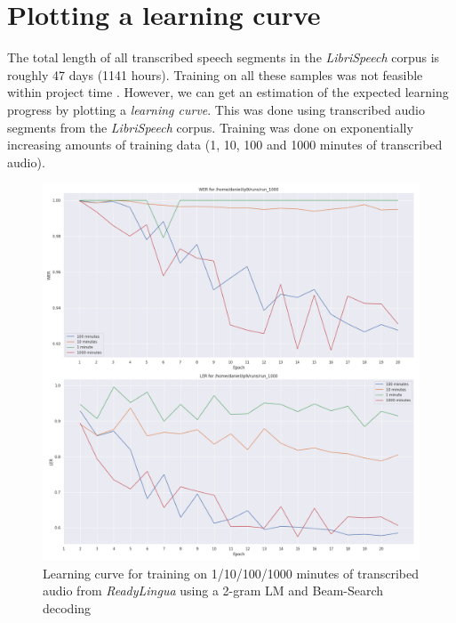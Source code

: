 \section{Plotting a learning curve}

The total length of all transcribed speech segments in the \textit{LibriSpeech} corpus is roughly 47 days (1141 hours). Training on all these samples was not feasible within project time . However, we can get an estimation of the expected learning progress by plotting a \textit{learning curve}. This was done using transcribed audio segments from the \textit{LibriSpeech} corpus. Training was done on exponentially increasing amounts of training data (1, 10, 100 and 1000 minutes of transcribed audio).

\begin{figure}
	\includegraphics[width=\linewidth]{./img/learning_curve_lm_beamsearch.png}
	\caption{Learning curve for training on 1/10/100/1000 minutes of transcribed audio from \textit{ReadyLingua} using a 2-gram \ac{LM} and Beam-Search decoding}
\end{figure}

